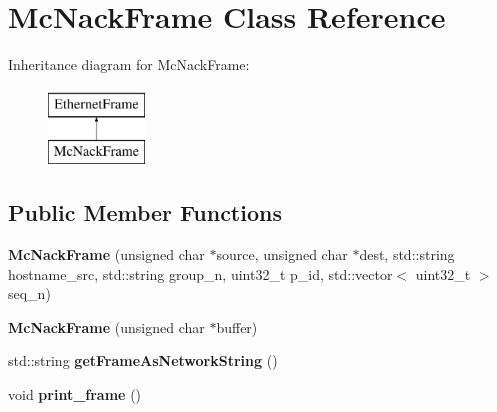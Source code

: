 \hypertarget{classMcNackFrame}{\section{Mc\-Nack\-Frame Class Reference}
\label{classMcNackFrame}
}
Inheritance diagram for Mc\-Nack\-Frame\-:\begin{figure}[H]
\begin{center}
\leavevmode
\includegraphics[height=2.000000cm]{classMcNackFrame}
\end{center}
\end{figure}
\subsection*{Public Member Functions}
\begin{DoxyCompactItemize}
\item 
\hypertarget{classMcNackFrame_af4db6b60b3850c8b77afa3370c07900f}{{\bfseries Mc\-Nack\-Frame} (unsigned char $\ast$source, unsigned char $\ast$dest, std\-::string hostname\-\_\-src, std\-::string group\-\_\-n, uint32\-\_\-t p\-\_\-id, std\-::vector$<$ uint32\-\_\-t $>$ seq\-\_\-n)}\label{classMcNackFrame_af4db6b60b3850c8b77afa3370c07900f}

\item 
\hypertarget{classMcNackFrame_a269261e2f28b1027b9f42ded34b2c550}{{\bfseries Mc\-Nack\-Frame} (unsigned char $\ast$buffer)}\label{classMcNackFrame_a269261e2f28b1027b9f42ded34b2c550}

\item 
\hypertarget{classMcNackFrame_aedae4da48bb66e40cfbf118e5843b4d7}{std\-::string {\bfseries get\-Frame\-As\-Network\-String} ()}\label{classMcNackFrame_aedae4da48bb66e40cfbf118e5843b4d7}

\item 
\hypertarget{classMcNackFrame_ad783c281cd160139a35d45764de323e9}{void {\bfseries print\-\_\-frame} ()}\label{classMcNackFrame_ad783c281cd160139a35d45764de323e9}

\end{DoxyCompactItemize}
